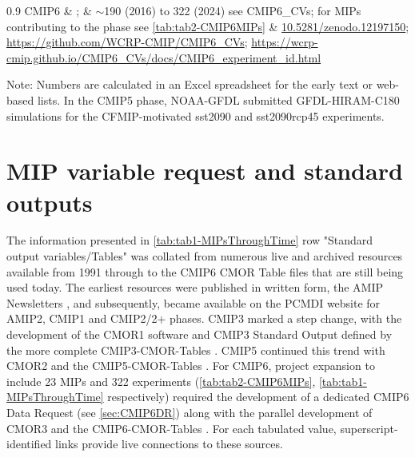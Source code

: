 \documentclass[gmd, preprint]{copernicus}
\begin{document}
\begin{table}[htp]
{\begin{tabularx}{0.9\textwidth}
			\hline			
			CMIP6 & \citet{eyring_overview_2016}; \citet{durack_cmip6_2024} & $\sim$190 (2016) to 322 (2024) see CMIP6\_CVs; for MIPs contributing to the phase see \autoref{tab:tab2-CMIP6MIPs} & \href{http://doi.org/10.5281/zenodo.12197150}{10.5281/zenodo.12197150}; \url{https://github.com/WCRP-CMIP/CMIP6\_CVs}; \url{https://wcrp-cmip.github.io/CMIP6\_CVs/docs/CMIP6\_experiment\_id.html}\\
			\hline		
		\end{tabularx}
	} %
	\label{tab:tabAppA1-MIPExperiments}
	\footnotesize{Note: Numbers are calculated in an Excel spreadsheet for the early text or web-based lists. In the CMIP5 phase, NOAA-GFDL submitted GFDL-HIRAM-C180 simulations for the CFMIP-motivated sst2090 and sst2090rcp45 experiments.}
\end{table}


\section{MIP variable request and standard outputs}  %
\label{sec:secAppB1-MIPStandardOutput}
The information presented in \autoref{tab:tab1-MIPsThroughTime} row "Standard output variables/Tables" was collated from numerous live and archived resources available from 1991 through to the CMIP6 CMOR Table files that are still being used today. The earliest resources were published in written form, the AMIP Newsletters \citep[e.g.,][]{gates_amip_1991}, and subsequently, became available on the PCMDI website for AMIP2, CMIP1 and CMIP2/2+ phases. CMIP3 marked a step change, with the development of the CMOR1 software \citep{taylor_cmor_2006} and CMIP3 Standard Output defined by the more complete CMIP3-CMOR-Tables \citep{doutriaux_cmip3_2005}. CMIP5 continued this trend with CMOR2 \citep{doutriaux_cmor_2011} and the CMIP5-CMOR-Tables \citep{doutriaux_cmip5_2013}. For CMIP6, project expansion to include 23 MIPs and 322 experiments (\autoref{tab:tab2-CMIP6MIPs}, \autoref{tab:tab1-MIPsThroughTime} respectively) required the development of a dedicated CMIP6 Data Request (see \autoref{sec:CMIP6DR}) along with the parallel development of CMOR3 \citep{mauzey_cmor_2024} and the CMIP6-CMOR-Tables \citep{nadeau_cmip6_2017}. For each tabulated value, superscript-identified links provide live connections to these sources.
\end{document}
